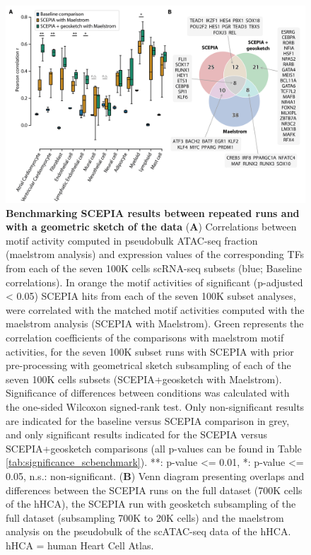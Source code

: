 \begin{figure}
    \centering
    \includegraphics[width=1.0\linewidth]{ch.scepia/imgs/OverlappingHitsBetweenSCEPIAGEOANDMAELSTROM_BlackMyriad_onlySign_baselineNS_v12_Centered_Figure5.png}
    \caption{\textbf{Benchmarking SCEPIA results between repeated runs and with a geometric sketch of the data} (\textbf{A}) Correlations between motif activity computed in pseudobulk ATAC-seq fraction (maelstrom analysis) and expression values of the corresponding TFs from each of the seven 100K cells scRNA-seq subsets (blue; Baseline correlations). In orange the motif activities of significant (p-adjusted < 0.05) SCEPIA hits from each of the seven 100K subset analyses, were correlated with the matched motif activities computed with the maelstrom analysis (SCEPIA with Maelstrom). Green represents the correlation coefficients of the comparisons with maelstrom motif activities, for the seven 100K subset runs with SCEPIA with prior pre-processing with geometrical sketch subsampling of each of the seven 100K cells subsets (SCEPIA+geosketch with Maelstrom). Significance of differences between conditions was calculated with the one-sided Wilcoxon signed-rank test. Only non-significant results are indicated for the baseline versus SCEPIA comparison in grey, and only significant results indicated for the SCEPIA versus SCEPIA+geosketch comparisons (all p-values can be found in Table \ref{tab:significance_scbenchmark}).  **: p-value <= 0.01, *: p-value <= 0.05, n.s.: non-significant. (\textbf{B}) Venn diagram presenting overlaps and differences between the SCEPIA runs on the full dataset (700K cells of the hHCA), the SCEPIA run with geosketch subsampling of the full dataset (subsampling 700K to 20K cells) and the maelstrom analysis on the pseudobulk of the scATAC-seq data of the hHCA. hHCA = human Heart Cell Atlas.}
    \label{fig:sc_benchmark}
\end{figure}

